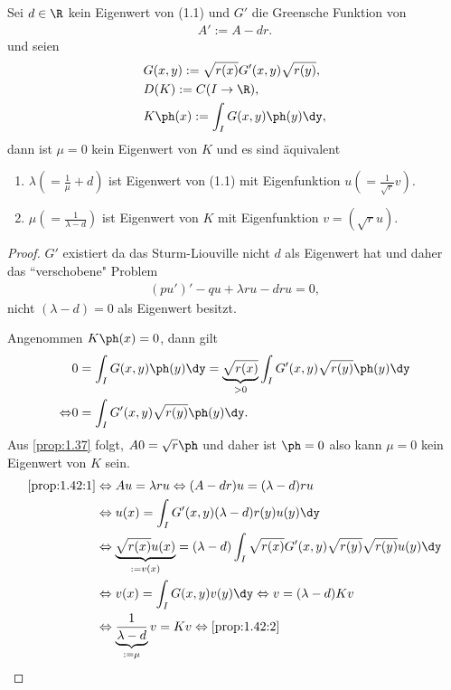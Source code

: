 \begin{prop}
\label{prop:1.42}
Sei $d\in\R$ kein Eigenwert von (1.1) und $G'$ die Greensche Funktion von
\begin{align*}
A' := A- dr.
\end{align*}
und seien
\begin{align*}
&G(x,y) := \sqrt{r(x)}G'(x,y)\sqrt{r(y)},\\
&D(K) := C(I\to\R),\\
&K\ph(x) := \int_I G(x,y)\ph(y)\dy,
\end{align*}
dann ist $\mu=0$ kein Eigenwert von $K$ und es sind äquivalent
\begin{enumerate}[label=(\roman{*})]
\item\label{prop:1.42:1} $\lambda\left(=\frac{1}{\mu}+d\right)$ ist Eigenwert
von (1.1) mit Eigenfunktion $u\left(=\frac{1}{\sqrt{r}}v\right)$.
\item\label{prop:1.42:2} $\mu\left(=\frac{1}{\lambda - d}\right)$ ist Eigenwert
von $K$ mit Eigenfunktion $v=\left(\sqrt{r}u\right)$.\fishhere
\end{enumerate}
\end{prop}
\begin{proof}
$G'$ existiert da das Sturm-Liouville nicht $d$ als Eigenwert hat und
daher das ``verschobene" Problem
\begin{align*}
(pu')' - qu + \lambda ru - dru = 0,
\end{align*}
nicht $(\lambda-d)=0$ als Eigenwert besitzt.

Angenommen $K\ph(x) = 0$, dann gilt
\begin{align*}
&0 = \int_I G(x,y)\ph(y)\dy = \underbrace{\sqrt{r(x)}}_{>0}\int_I
G'(x,y)\sqrt{r(y)}\ph(y)\dy\\ \Leftrightarrow & 0=\int_I
G'(x,y)\sqrt{r(y)}\ph(y)\dy.
\end{align*}
Aus \ref{prop:1.37} folgt, $A0 = \sqrt{r}\ph$ und daher ist $\ph=0$ also kann
$\mu=0$ kein Eigenwert von $K$ sein.
\begin{align*}
\ref{prop:1.42:1}
&\Leftrightarrow Au = \lambda ru
\Leftrightarrow (A-dr)u = (\lambda - d)ru\\
&\Leftrightarrow u(x) = \int_I G'(x,y)(\lambda-d)r(y)u(y)\dy\\
&\Leftrightarrow \underbrace{\sqrt{r(x)}u(x)}_{:=v(x)} =
(\lambda-d)\int_I\sqrt{r(x)}G'(x,y)\sqrt{r(y)}\sqrt{r(y)} u(y)\dy\\
&\Leftrightarrow v(x) = \int_I G(x,y)v(y)\dy
\Leftrightarrow v = (\lambda-d)Kv\\
&\Leftrightarrow \underbrace{\frac{1}{\lambda-d}}_{:=\mu}v = Kv
\Leftrightarrow \ref{prop:1.42:2}\qedhere
\end{align*}
\end{proof}

